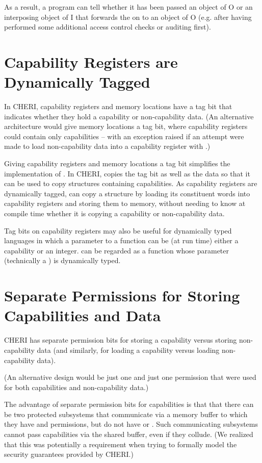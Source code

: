 As a result, a program can tell whether it has been passed an object of
\cotype{} O or an interposing object of \cotype{} I that  forwards the
 on to an object of \cotype{} O (e.g. after having performed
some additional access control checks or auditing first).

\section{Capability Registers are Dynamically Tagged}

In CHERI, capability registers and memory locations have a tag bit
that indicates whether they hold a capability or non-capability data.
(An alternative architecture would give memory locations a tag bit,
where capability registers could contain only capabilities -- with
an exception raised if an attempt were made to load non-capability data into a
capability register with .)

Giving capability registers and memory locations a tag bit
simplifies the implementation of .
In CHERI,  copies
the tag bit as well as the data so that it can be used to copy structures
containing capabilities. As capability registers are dynamically tagged,
 can copy a structure by loading
its constituent words into capability
registers and storing them to memory, without needing to know at compile time
whether it is copying a capability or non-capability data.

Tag bits on capability registers may also be useful for dynamically typed
languages in which a parameter to a function can be (at run time) either a
capability or an integer.  can be regarded as
a function whose parameter (technically a ) is
dynamically typed.

\section{Separate Permissions for Storing Capabilities and Data}

CHERI has separate permission bits for storing a capability versus storing
non-capability data (and similarly, for loading a capability versus loading
non-capability data).

(An alternative design would be just one \cappermL{} and just one
\cappermS{} permission that were used for both capabilities and non-capability data.)

The advantage of separate permission bits for capabilities is that
that there can be two protected subsystems that communicate via a memory
buffer to which they have \cappermL{} and \cappermS{} permissions, but
do not have \cappermLC{} or \cappermSC{}. Such
communicating subsystems cannot pass capabilities via the shared buffer, even
if they collude. (We realized that this was potentially a requirement when
trying to formally model the security guarantees provided by CHERI.)

